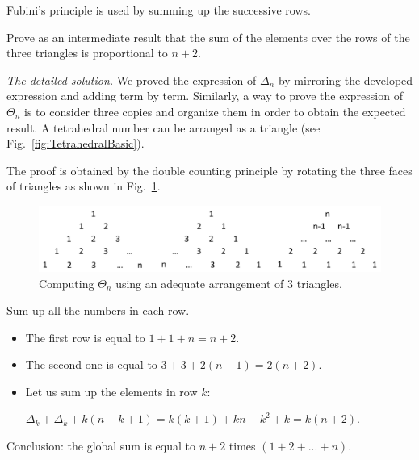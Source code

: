 Fubini's principle is used by summing up the successive rows.

Prove as an intermediate result that the sum of the elements over the rows of the three triangles is proportional to $n+2$.
\medskip

\noindent \textit{The detailed solution.}
We proved the expression of $\Delta_n$ by mirroring the developed expression and adding term by term.
Similarly, a way to prove the expression of $\Theta_n$ is to consider three copies and organize them 
in order to obtain the expected result.
A tetrahedral number can be arranged as a triangle (see Fig.~\ref{fig:TetrahedralBasic}).

The proof is obtained by the double counting principle by rotating the three faces of triangles as shown in Fig.~\ref{fig:Tetrahedral}.
\begin{figure}[h]
\begin{center}
        \includegraphics[scale=0.5]{FiguresArithmetic/Tetrahedral}
        \caption{Computing $\Theta_n$ using an adequate arrangement of $3$ triangles.}
        \label{fig:Tetrahedral}
\end{center}
\end{figure}

Sum up all the numbers in each row.

\begin{itemize}
\item 
The first row is equal to $1+1+n = n+2$.
\item
The second one is equal to $3 + 3 + 2(n-1) = 2(n+2)$. 
\item
Let us sum up the elements in row $k$: 

$\Delta_k + \Delta_k + k(n-k+1)  = k(k+1) + kn-k^2+k = k(n+2)$.
\end{itemize}

Conclusion:
the global sum is equal to $n+2$ times $(1+2+...+n)$.

